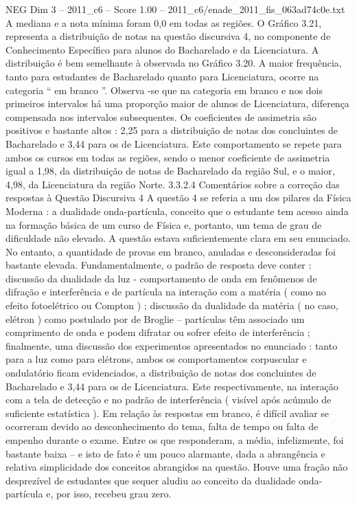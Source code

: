 \begin{textsample}{NEG Dim 3 – 2011\_c6 – Score 1.00 – 2011\_c6/enade\_2011\_fis\_063ad74c0e.txt}
A mediana e a nota mínima foram 0,0 em todas as regiões.
O Gráfico 3.21, representa a distribuição de notas na questão discursiva 4, no componente de Conhecimento Específico para alunos do Bacharelado e da Licenciatura.
A distribuição é bem semelhante à observada no Gráfico 3.20.
A maior frequência, tanto para estudantes de Bacharelado quanto para Licenciatura, ocorre na categoria “ em branco ”.
Observa -se que na categoria em branco e nos dois primeiros intervalos há uma proporção maior de alunos de Licenciatura, diferença compensada nos intervalos subsequentes.
Os coeficientes de assimetria são positivos e bastante altos : 2,25 para a distribuição de notas dos concluintes de Bacharelado e 3,44 para os de Licenciatura.
Este comportamento se repete para ambos os cursos em todas as regiões, sendo o menor coeficiente de assimetria igual a 1,98, da distribuição de notas de Bacharelado da região Sul, e o maior, 4,98, da Licenciatura da região Norte. 3.3.2.4 Comentários sobre a correção das respostas à Questão Discursiva 4 A questão 4 se referia a um dos pilares da Física Moderna : a dualidade onda-partícula, conceito que o estudante tem acesso ainda na formação básica de um curso de Física e, portanto, um tema de grau de dificuldade não elevado.
A questão estava suficientemente clara em seu enunciado.
No entanto, a quantidade de provas em branco, anuladas e desconsideradas foi bastante elevada.
Fundamentalmente, o padrão de resposta deve conter : discussão da dualidade da luz - comportamento de onda em fenômenos de difração e interferência e de partícula na interação com a matéria ( como no efeito fotoelétrico ou Compton ) ; discussão da dualidade da matéria ( no caso, elétron ) como postulado por de Broglie – partículas têm associado um comprimento de onda e podem difratar ou sofrer efeito de interferência ; finalmente, uma discussão dos experimentos apresentados no enunciado : tanto para a luz como para elétrons, ambos os comportamentos corpuscular e ondulatório ficam evidenciados, a distribuição de notas dos concluintes de Bacharelado e 3,44 para os de Licenciatura.
Este respectivamente, na interação com a tela de detecção e no padrão de interferência ( visível após acúmulo de suficiente estatística ).
Em relação às respostas em branco, é difícil avaliar se ocorreram devido ao desconhecimento do tema, falta de tempo ou falta de empenho durante o exame.
Entre os que responderam, a média, infelizmente, foi bastante baixa – e isto de fato é um pouco alarmante, dada a abrangência e relativa simplicidade dos conceitos abrangidos na questão.
Houve uma fração não desprezível de estudantes que sequer aludiu ao conceito da dualidade onda-partícula e, por isso, recebeu grau zero.

\end{textsample}
